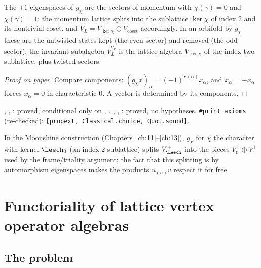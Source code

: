 \begin{physics}
The $\pm1$ eigenspaces of $g_\chi$ are the sectors of momentum with $\chi(\gamma)=0$ and $\chi(\gamma)=1$: the momentum lattice splits into the sublattice $\ker\chi$ of index $2$ and its nontrivial coset, and $V_L=V_{\ker\chi}\oplus V_{\text{coset}}$ accordingly. In an orbifold by $g_\chi$ these are the untwisted states kept (the even sector) and removed (the odd sector); the invariant subalgebra $V_L^{g_\chi}$ is the lattice algebra $V_{\ker\chi}$ of the index-two sublattice, plus twisted sectors.
\end{physics}
\begin{proof}[Proof on paper]
Compare components: $(g_\chi x)_\alpha=(-1)^{\chi(\alpha)}x_\alpha$, and $x_\alpha=-x_\alpha$
forces $x_\alpha=0$ in characteristic $0$. A vector is determined by its components.
\end{proof}
\begin{status}
, , : proved, conditional only on
, . , ,
: proved, no hypotheses. \texttt{\#print axioms} (re-checked):
\texttt{[propext, Classical.choice, Quot.sound]}.
\end{status}

In the Moonshine construction (Chapters~\ref{ch:11}--\ref{ch:13}), $g_\chi$ for $\chi$ the
character with kernel $\Leech_0$ (an index-$2$ sublattice) splits $V_\Leech^+$ into the pieces
$V_0^+\oplus V_1^+$ used by the frame/triality argument; the fact that this splitting is by
automorphism eigenspaces makes the products $u_{(n)}v$ respect it for free.

\section{Functoriality of lattice vertex operator algebras}\label{ch03:sec:functoriality}

\subsection{The problem}

